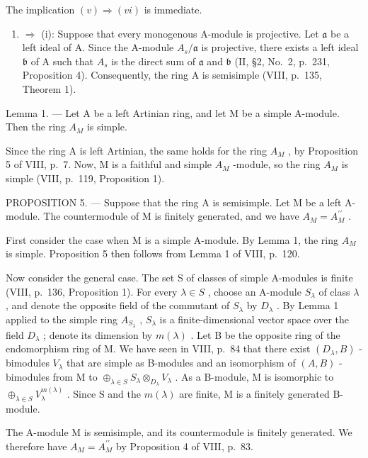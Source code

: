 The implication \((v) \Rightarrow (vi)\) is immediate.

\begin{enumerate}
\def\labelenumi{(\roman{enumi})}
\setcounter{enumi}{5}
\tightlist
\item
  \(\Rightarrow\) (i): Suppose that every monogenous A-module is projective. Let \(\mathfrak{a}\) be a left ideal of A. Since the A-module \(A_s / \mathfrak{a}\) is projective, there exists a left ideal \(\mathfrak{b}\) of A such that \(A_s\) is the direct sum of \(\mathfrak{a}\) and \(\mathfrak{b}\) (II, §2, No.~2, p.~231, Proposition 4). Consequently, the ring A is semisimple (VIII, p.~135, Theorem 1).
\end{enumerate}

Lemma 1. --- Let A be a left Artinian ring, and let M be a simple A-module. Then the ring \(A_{M}\) is simple.

Since the ring A is left Artinian, the same holds for the ring \(A_{M}\) , by Proposition 5 of VIII, p.~7. Now, M is a faithful and simple \(A_{M}\) -module, so the ring \(A_{M}\) is simple (VIII, p.~119, Proposition 1).

PROPOSITION 5. --- Suppose that the ring A is semisimple. Let M be a left A-module. The countermodule of M is finitely generated, and we have \(A_{M} = A_{M}^{\prime\prime}\) .

First consider the case when M is a simple A-module. By Lemma 1, the ring \(A_{M}\) is simple. Proposition 5 then follows from Lemma 1 of VIII, p.~120.

Now consider the general case. The set S of classes of simple A-modules is finite (VIII, p.~136, Proposition 1). For every \(\lambda \in S\) , choose an A-module \(S_{\lambda}\) of class \(\lambda\) , and denote the opposite field of the commutant of \(S_{\lambda}\) by \(D_{\lambda}\) . By Lemma 1 applied to the simple ring \(A_{S_{\lambda}}\) , \(S_{\lambda}\) is a finite-dimensional vector space over the field \(D_{\lambda}\) ; denote its dimension by \(m(\lambda)\) . Let B be the opposite ring of the endomorphism ring of M. We have seen in VIII, p.~84 that there exist \((D_{\lambda}, B)\) -bimodules \(V_{\lambda}\) that are simple as B-modules and an isomorphism of \((A, B)\) -bimodules from M to \(\oplus_{\lambda \in S} S_{\lambda} \otimes_{D_{\lambda}} V_{\lambda}\) . As a B-module, M is isomorphic to \(\oplus_{\lambda \in S} V_{\lambda}^{m(\lambda)}\) . Since S and the \(m(\lambda)\) are finite, M is a finitely generated B-module.

The A-module M is semisimple, and its countermodule is finitely generated. We therefore have \(A_{M} = A_{M}^{\prime\prime}\) by Proposition 4 of VIII, p.~83.

